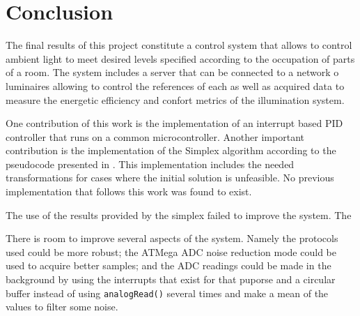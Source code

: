 \section{Conclusion}
\label{conclusion}

The final results of this project constitute a control system that allows to control ambient light to meet desired levels specified according to the occupation of parts of a room. The system includes a server that can be connected to a network o luminaires allowing to control the references of each as well as acquired data to measure the energetic efficiency and confort metrics of the illumination system.

One contribution of this work is the implementation of an interrupt based PID controller that runs on a common microcontroller. Another important contribution is the implementation of the Simplex algorithm according to the pseudocode presented in \cite{Cormen}. This implementation includes the needed transformations for cases where the initial solution is unfeasible. No previous implementation that follows this work was found to exist.

The use of the results provided by the simplex failed to improve the system. The

There is room to improve several aspects of the system. Namely the protocols used could be more robust; the ATMega ADC noise reduction mode could be used to acquire better samples; and the ADC readings could be made in the background by using the interrupts that exist for that puporse and a circular buffer instead of using \texttt{analogRead()} several times and make a mean of the values to filter some noise.



